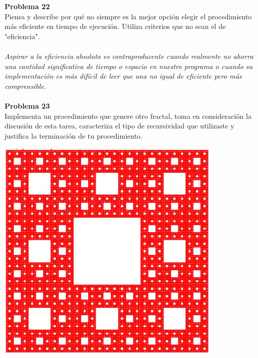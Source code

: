\documentclass[14pt]{article}
\begin{document}
	\\
	\\{\large\textbf{Problema 22}}
	\\ Piensa y describe por qué no siempre es la mejor opción elegir el procedimiento más
	eficiente en tiempo de ejecución. Utiliza criterios que no sean el de "eficiencia".
	\\
	\\\textit{Aspirar a la eficiencia absoluta es contraproducente cuando realmente no ahorra una cantidad significativa de tiempo o espacio en nuestro programa o cuando su implementación es más difícil de leer que una no igual de eficiente pero más comprensible.}
	\\
	\\{\large\textbf{Problema 23}}
	\\Implementa un procedimiento que genere otro fractal, toma en consideración la discusión de esta tarea, caracteriza el tipo de recursividad que utilizaste y justifica la terminación de tu procedimiento.
	\\
	\begin{center}
		\includegraphics[width=0.8\textwidth]{spki}
	\end{center}
\end{document}
